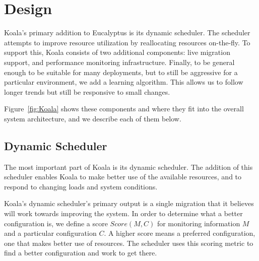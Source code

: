 \section{Design}
\label{sec:design}


Koala's primary addition to Eucalyptus is its dynamic scheduler.  The scheduler
attempts to improve resource utilization by reallocating resources on-the-fly.
To support this, Koala consists of two additional components: live migration
support, and performance monitoring infrastructure.  Finally, to be general
enough to be suitable for many deployments, but to still be aggressive for a
particular environment, we add a learning algorithm.  This allows us to follow
longer trends but still be responsive to small changes.

Figure~\ref{fig:Koala} shows these components and where they fit into the
overall system architecture, and we describe each of them below.


\subsection{Dynamic Scheduler}

The most important part of Koala is its dynamic scheduler.  The addition of this
scheduler enables Koala to make better use of the available resources, and to
respond to changing loads and system conditions.

Koala's dynamic scheduler's primary output is a single migration that it
believes will work towards improving the system.  In order to determine what a
better configuration is, we define a score $Score(M,C)$ for monitoring
information $M$ and a particular configuration $C$.  A higher score means a
preferred configuration, one that makes better use of resources.  The scheduler
uses this scoring metric to find a better configuration and work to get there.

